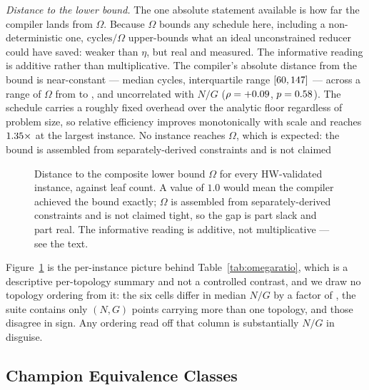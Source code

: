 \documentclass[journal,10pt]{IEEEtran}
\theoremstyle{plain}
\theoremstyle{definition}
\theoremstyle{remark}
\begin{document}
\emph{Distance to the lower bound.} The one absolute statement available is
how far the compiler lands from $\Omega$. Because $\Omega$ bounds any schedule
here, including a non-deterministic one, $\mathrm{cycles}/\Omega$
upper-bounds what an ideal unconstrained reducer could have saved: weaker than
$\eta$, but real and measured. The informative reading is additive rather than
multiplicative. The compiler's absolute distance from the bound is
near-constant --- median \SlackMedian{} cycles, interquartile range
$[60, 147]$ --- across a range of $\Omega$ from
\SlackOmegaLo{} to \SlackOmegaHi{}, and uncorrelated with $N/G$
($\rho = +0.09{}$, $p = 0.58{}$). The schedule carries a roughly
fixed overhead over the analytic floor regardless of problem size, so relative
efficiency improves monotonically with scale and reaches $1.35\times$ at
the largest instance. No instance reaches $\Omega$, which is expected: the
bound is assembled from separately-derived constraints and is not claimed
\begin{figure}[!tb]
\centering

\caption{Distance to the composite lower bound $\Omega$ for every
  HW-validated instance, against leaf count. A value of $1.0$ would mean the
  compiler achieved the bound exactly; $\Omega$ is assembled from
  separately-derived constraints and is not claimed tight, so the gap is part
  slack and part real. The informative reading is additive, not
  multiplicative --- see the text.}
\label{fig:omegabyinst}
\end{figure}

Figure~\ref{fig:omegabyinst} is the per-instance picture behind
Table~\ref{tab:omegaratio}, which is a descriptive per-topology summary and
not a controlled contrast, and we draw no topology ordering from it: the six
cells differ in median $N/G$ by a factor of \TopoNGSpread{}, the suite
contains only \TopoMultiPoint{} $(N,G)$ points carrying more than one topology,
and those \TopoMultiPoint{} disagree in sign. Any ordering read off that column
is substantially $N/G$ in disguise.

\subsection{Champion Equivalence Classes}\label{sec:results-classes}
\end{document}
